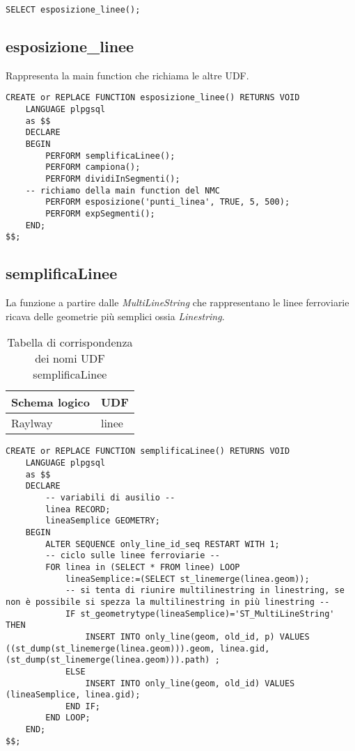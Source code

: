 \begin{lstlisting}[style=mySQL]
SELECT esposizione_linee();
\end{lstlisting}     

\subsection{esposizione\_linee}
Rappresenta la main function che richiama le altre UDF.

\begin{lstlisting}[style=mySQL]
CREATE or REPLACE FUNCTION esposizione_linee() RETURNS VOID
	LANGUAGE plpgsql
	as $$
	DECLARE
	BEGIN
		PERFORM semplificaLinee();
		PERFORM campiona();
		PERFORM dividiInSegmenti();
    -- richiamo della main function del NMC
		PERFORM esposizione('punti_linea', TRUE, 5, 500);
		PERFORM expSegmenti();
	END;
$$;
\end{lstlisting}

\subsection{semplificaLinee}
La funzione a partire dalle \textit{MultiLineString} che rappresentano le linee ferroviarie ricava delle geometrie più semplici ossia \textit{Linestring}.\\

\begin{table}[h]
\centering
\caption{Tabella di corrispondenza dei nomi UDF semplificaLinee}
\label{mapTb3}
\begin{tabular}{|l|l|}
\hline
Schema logico       & UDF                \\ \hline
Raylway          & linee              \\ \hline
\end{tabular}
\end{table}

\begin{lstlisting}[style=mySQL]
CREATE or REPLACE FUNCTION semplificaLinee() RETURNS VOID
	LANGUAGE plpgsql
	as $$
	DECLARE
		-- variabili di ausilio --
		linea RECORD;
		lineaSemplice GEOMETRY;
	BEGIN
		ALTER SEQUENCE only_line_id_seq RESTART WITH 1;
		-- ciclo sulle linee ferroviarie --
		FOR linea in (SELECT * FROM linee) LOOP
			lineaSemplice:=(SELECT st_linemerge(linea.geom));
			-- si tenta di riunire multilinestring in linestring, se non è possibile si spezza la multilinestring in più linestring --
			IF st_geometrytype(lineaSemplice)='ST_MultiLineString' THEN
				INSERT INTO only_line(geom, old_id, p) VALUES ((st_dump(st_linemerge(linea.geom))).geom, linea.gid, (st_dump(st_linemerge(linea.geom))).path) ;
			ELSE
				INSERT INTO only_line(geom, old_id) VALUES (lineaSemplice, linea.gid);
			END IF;
		END LOOP;
	END;
$$;
\end{lstlisting}

